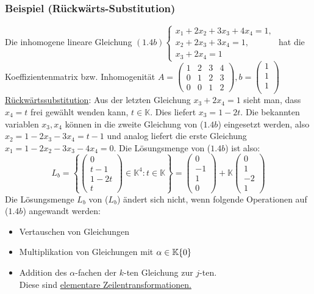 \subsubsection{Beispiel (Rückwärts-Substitution)}
Die inhomogene lineare Gleichung $(1.4b)\begin{cases}x_1+2x_2+3x_3+4x_4=1,\\ x_2+2x_3+3x_4=1,\\x_3+2x_4=1\end{cases}$ hat die Koeffizientenmatrix bzw. Inhomogenität $A=\left(\begin{array}{cccc}1 & 2 & 3 & 4 \\ 0 & 1 & 2 & 3\\ 0 & 0 & 1 & 2\end{array}\right), b=\left(\begin{array}{c}1\\ 1\\ 1\\\end{array}\right)$\\
\underline{Rückwärtssubstitution}: Aus der letzten Gleichung $x_3+2x_4=1$ sieht man, dass $x_4=t$ frei gewählt wenden kann, $t\in \mathbb{K}$.  Dies liefert $x_3=1-2t$.  Die bekannten variablen $x_3,x_4$ können in die zweite Gleichung von ($1.4b$) eingesetzt werden, also $x_2 = 1-2x_3-3x_4=t-1$ und analog liefert die erste Gleichung $x_1=1-2x_2-3x_3-4x_4=0$.  Die Lösungsmenge von ($1.4b$) ist also:\[L_b=\left\{\left(\begin{array}{c}0\\ t-1\\ 1-2t\\ t\end{array}\right)\in \mathbb{K}^4:t\in\mathbb{K}\right\} = \left(\begin{array}{c}0\\ -1\\ 1\\ 0\end{array}\right)+\mathbb{K}\left(\begin{array}{c}0\\ 1\\ -2 \\1\end{array}\right)\]
Die Lösungsmenge $L_b$ von ($L_b$) ändert sich nicht, wenn folgende Operationen auf ($1.4b$) angewandt werden:
\begin{itemize}
\item Vertauschen von Gleichungen
\item Multiplikation von Gleichungen mit $\alpha \in \mathbb{K}\\\{0\}$
\item Addition des $\alpha$-fachen der $k$-ten Gleichung zur $j$-ten.\\
Diese sind \underline{elementare Zeilentransformationen.}
\end{itemize}
